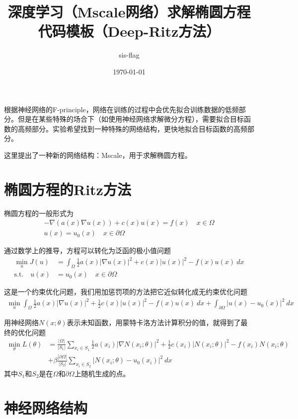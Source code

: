 \documentclass[12pt,a4paper]{article}
\title{深度学习（Mscale网络）求解椭圆方程代码模板（Deep-Ritz方法）}
\author{sis-flag}
\date{\today}
\begin{document}
\maketitle

根据神经网络的F-principle，网络在训练的过程中会优先拟合训练数据的低频部分。但是在某些特殊的场合下（如使用神经网络求解微分方程），需要拟合目标函数的高频部分。实验希望找到一种特殊的网络结构，更快地拟合目标函数的高频部分。

这里提出了一种新的网络结构：Mscale，用于求解椭圆方程。

\section*{椭圆方程的Ritz方法}

椭圆方程的一般形式为
\begin{align*}
-\nabla(a(x) \nabla u(x)) + c(x) u(x) = f(x) \quad x \in \Omega \\
u(x) = u_0(x) \quad x \in \partial \Omega
\end{align*}

通过数学上的推导\cite{deep-ritz}，方程可以转化为泛函的极小值问题
\begin{align*}
\min_{u} J(u) & = \int_{\Omega} \frac{1}{2} a(x) |\nabla u(x)|^2 + c(x) |u(x)|^2 - f(x) u(x) \ dx \\
\text{s.t.} \quad u(x) & = u_0(x) \quad x \in \partial \Omega 
\end{align*}

这是一个约束优化问题，我们用加惩罚项的方法把它近似转化成无约束优化问题
\begin{align*}
\min_{u} \int_{\Omega} \frac{1}{2} a(x) |\nabla u(x)|^2 + \frac{1}{2} c(x) |u(x)|^2 - f(x) u(x) \ dx + \int_{\partial \Omega} |u(x) - u_0(x)|^2 \ dx
\end{align*}

用神经网络$N(x; \theta)$表示未知函数，用蒙特卡洛方法计算积分的值，就得到了最终的优化问题
\begin{align*}
\min_{\theta} L(\theta) & = \frac{|\Omega|}{|S_1|} \sum_{x_i \in S_1} \frac{1}{2} a(x_i) |\nabla N(x_i; \theta)|^2 + \frac{1}{2} c(x_i) |N(x_i; \theta)|^2 - f(x_i) N(x_i; \theta) \\
& + \beta \frac{|\partial \Omega|}{|S_2|} \sum_{x_i \in S_2} |N(x_i; \theta) - u_0(x_i)|^2 \ dx
\end{align*}
其中$S_1$和$S_2$是在$\Omega$和$\partial \Omega$上随机生成的点。

\section*{神经网络结构}
\end{document}
